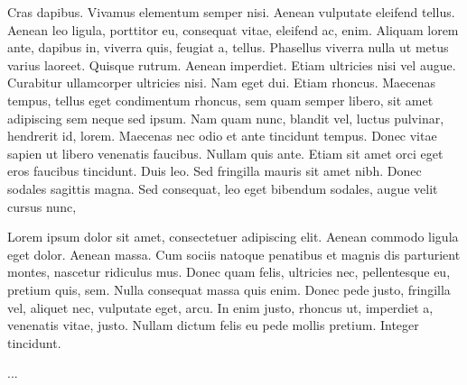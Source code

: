 \documentclass[USenglish]{article}
\begin{document}
  Cras dapibus. Vivamus elementum semper nisi. Aenean vulputate eleifend tellus. Aenean
  leo ligula, porttitor eu, consequat vitae, eleifend ac, enim. Aliquam lorem ante, dapibus in,
  viverra quis, feugiat a, tellus. Phasellus viverra nulla ut metus varius laoreet. Quisque
  rutrum. Aenean imperdiet. Etiam ultricies nisi vel augue. Curabitur ullamcorper ultricies
  nisi. Nam eget dui. Etiam rhoncus. Maecenas tempus, tellus eget condimentum rhoncus, sem quam
  semper libero, sit amet adipiscing sem neque sed ipsum. Nam quam nunc, blandit vel, luctus
  pulvinar, hendrerit id, lorem. Maecenas nec odio et ante tincidunt tempus. Donec vitae sapien ut
  libero venenatis faucibus. Nullam quis ante. Etiam sit amet orci eget eros faucibus
  tincidunt. Duis leo. Sed fringilla mauris sit amet nibh. Donec sodales sagittis magna. Sed
  consequat, leo eget bibendum sodales, augue velit cursus nunc,

Lorem ipsum dolor sit amet, consectetuer adipiscing elit. Aenean commodo ligula eget dolor. Aenean
  massa. Cum sociis natoque penatibus et magnis dis parturient montes, nascetur ridiculus mus. Donec
  quam felis, ultricies nec, pellentesque eu, pretium quis, sem. Nulla consequat massa quis
  enim. Donec pede justo, fringilla vel, aliquet nec, vulputate eget, arcu. In enim justo, rhoncus
  ut, imperdiet a, venenatis vitae, justo. Nullam dictum felis eu pede mollis pretium. Integer
  tincidunt.


\begin{acknowledgement}
  ...
\end{acknowledgement}

%
%
\end{document}
